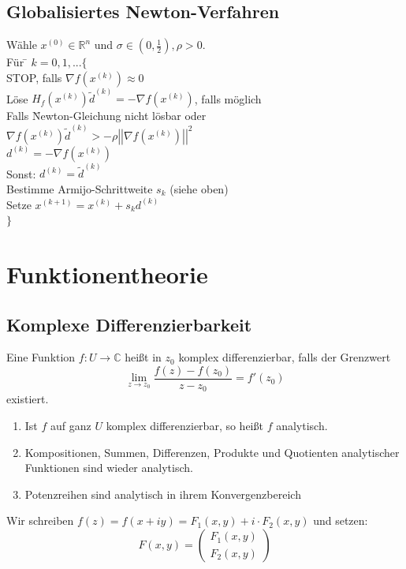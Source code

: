 \documentclass[a4paper,twocolumn,10pt]{article}
\begin{document}
\subsection{Globalisiertes Newton-Verfahren}
\begin{tabbing}
Wähle $x^{(0)}\in\mathbb{R}^n$ und $\sigma\in\left(0,\frac{1}{2}\right),\rho>0$.\\
Für \= $k=0,1,...\{$\\
\> STOP, falls $\nabla f\left(x^{(k)}\right)\approx 0$\\
\> Löse $H_f\left(x^{(k)}\right)\tilde{d}^{(k)}=-\nabla f\left(x^{(k)}\right)$, falls möglich\\
\>Falls \=Newton-Gleichung nicht lösbar oder\\
\>$\nabla f\left(x^{(k)}\right)\tilde{d}^{(k)}>-\rho \left|\left|\nabla f\left(x^{(k)}\right)\right|\right|^2$\\
\>\> $d^{(k)}=-\nabla f\left(x^{(k)}\right)$\\
\>Sonst: $d^{(k)}=\tilde{d}^{(k)}$\\
\> Bestimme Armijo-Schrittweite $s_k$ (siehe oben)\\
\> Setze $x^{(k+1)}=x^(k)+s_kd^{(k)}$\\
$\}$
\end{tabbing}

\section{Funktionentheorie}

\subsection{Komplexe Differenzierbarkeit}
Eine Funktion $f:U\rightarrow\mathbb{C}$ heißt in $z_0$ komplex differenzierbar, falls der Grenzwert
\begin{equation*}
\lim\limits_{z\rightarrow z_0}\frac{f(z)-f(z_0)}{z-z_0}=f'(z_0)
\end{equation*}
existiert.
\begin{enumerate}[label=$\bullet$]
\item Ist $f$ auf ganz $U$ komplex differenzierbar, so heißt $f$ analytisch.
\item Kompositionen, Summen, Differenzen, Produkte und Quotienten analytischer Funktionen sind wieder analytisch.
\item Potenzreihen sind analytisch in ihrem Konvergenzbereich
\end{enumerate}
Wir schreiben $f(z)=f(x+iy)=F_1(x,y)+i\cdot F_2(x,y)$ und setzen:
\begin{equation*}
F(x,y)=\begin{pmatrix}F_1(x,y) \\ F_2(x,y)\end{pmatrix}
\end{equation*}
\end{document}

